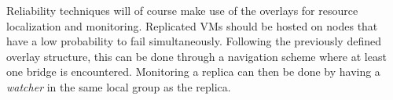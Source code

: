 Reliability techniques will of course make use of the overlays
for resource localization and monitoring. 
Replicated VMs should be hosted on nodes that have a low
probability to fail simultaneously. Following the previously defined
overlay structure, this can be done through a navigation scheme where
at least one bridge is encountered. Monitoring a replica can then be
done by having a \emph{watcher} in the same local group as the
replica.





%

